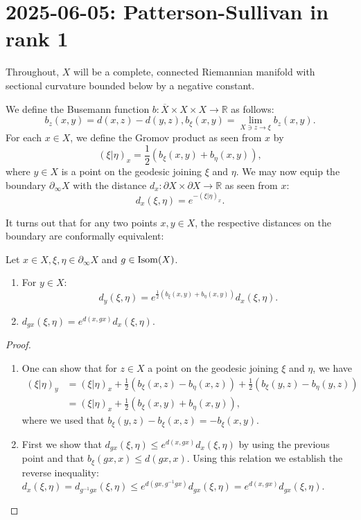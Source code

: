 \documentclass{report}
\begin{document}
\section{2025-06-05: Patterson-Sullivan in rank 1}
\begin{assumption}
Throughout, $X$ will be a complete, connected Riemannian manifold with sectional curvature bounded below by a negative constant.
\end{assumption}
\begin{definition}
    We define the Busemann function $b: \overline X \times X \times X \to \mathbb R$ as follows:
    \[
    b_z(x,y) = d(x,z) - d(y,z), b_\xi(x,y) = \lim_{X \ni z \to \xi} b_z(x,y).
    \]
    For each $x \in X$, we define the Gromov product as seen from $x$ by
    \[
    (\xi | \eta)_x = \frac{1}{2}\left(b_\xi(x,y) + b_\eta(x,y)\right),
    \]
    where $y \in X$ is a point on the geodesic joining $\xi$ and $\eta$.
    We may now equip the boundary $\partial_\infty X$ with the distance $d_x: \partial X \times \partial X \to \mathbb R$ as seen from $x$:
    \[
    d_x(\xi, \eta) = e^{-(\xi | \eta)_x}.
    \]
\end{definition}
It turns out that for any two points $x, y \in X$, the respective distances on the boundary are conformally equivalent:
\begin{lemma}
    Let $x \in X, \xi, \eta \in \partial_\infty X$ and $g \in \operatorname{Isom}(X)$.
    \begin{enumerate}[label=(\roman*)]
        \item For $y \in X$:
        \[
        d_y(\xi, \eta) = e^{\frac{1}{2}\left(b_\xi(x,y) + b_\eta(x,y)\right)} d_x(\xi, \eta).
        \]
        \item $d_{gx}(\xi, \eta) = e^{d(x, gx)} d_x(\xi, \eta)$.\label{item:conformality}
    \end{enumerate}
\end{lemma}
\begin{proof}
    \begin{enumerate}[label=(\roman*)]
        \item One can show that for $z \in X$ a point on the geodesic joining $\xi$ and $\eta$, we have
        \begin{align*}
            (\xi | \eta)_y &= (\xi | \eta)_x + \frac{1}{2}\left(b_\xi(x,z) - b_\eta(x,z)\right)+ \frac{1}{2}\left(b_\xi(y,z) - b_\eta(y,z)\right) \\
            &= (\xi | \eta)_x + \frac{1}{2}\left(b_\xi(x,y) + b_\eta(x,y)\right),
        \end{align*}
        where we used that $b_\xi(y,z) - b_\xi(x,z) = -b_\xi(x,y)$.
        \item First we show that $d_{gx}(\xi, \eta) \leq e^{d(x, gx)} d_x(\xi, \eta)$ by using the previous point and that $b_\xi(gx, x) \leq d(gx, x)$.
        Using this relation we establish the reverse inequality: $d_x(\xi, \eta) = d_{g^{-1}gx}(\xi, \eta) \leq e^{d(gx, g^{-1}g x )}d_{gx}(\xi, \eta) = e^{d(x, gx)} d_{gx}(\xi, \eta)$.
    \end{enumerate}
\end{proof}
\end{document}
